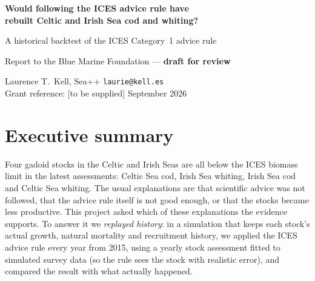 \documentclass[11pt,a4paper]{article}
\begin{document}
\thispagestyle{empty}
\begin{center}
{\color{bmblue}\LARGE\bfseries Would following the ICES advice rule have\\[0.2em]
rebuilt Celtic and Irish Sea cod and whiting?\par}
\vspace{0.6em}
{\large A historical backtest of the ICES Category~1 advice rule\par}
\vspace{1.0em}
{\large Report to the Blue Marine Foundation --- \textbf{draft for review}\par}
\vspace{0.8em}
Laurence T.~Kell, Sea++ \quad\textperiodcentered\quad \texttt{laurie@kell.es}\\[0.2em]
\small Grant reference: [to be supplied] \quad\textperiodcentered{} September 2026
\end{center}
\vspace{0.5em}

\section*{Executive summary}

Four gadoid stocks in the Celtic and Irish Seas are all below the ICES
biomass limit in the latest assessments: Celtic Sea cod, Irish Sea
whiting, Irish Sea cod and Celtic Sea whiting. The usual explanations are
that scientific advice was not followed, that the advice rule itself is not
good enough, or that the stocks became less productive. This project asked
which of these explanations the evidence supports. To answer it we
\emph{replayed history}: in a simulation that keeps each stock's actual
growth, natural mortality and recruitment history, we applied the ICES
advice rule every year from 2015, using a yearly stock assessment
fitted to simulated survey data (so the rule sees the stock with realistic
error), and compared the result with what actually happened.
\end{document}
